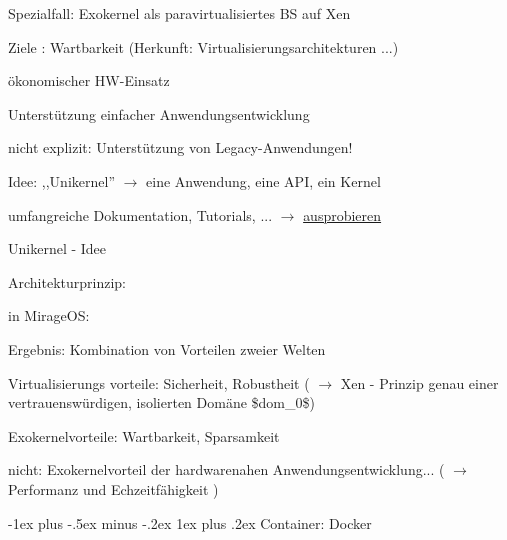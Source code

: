 \documentclass[a4paper]{article}
\makeatletter
\renewcommand{\subsubsection}{\@startsection{subsubsection}{3}{0mm}%
 {-1ex plus -.5ex minus -.2ex}%
 {1ex plus .2ex}%
 {\normalfont\small\bfseries}}
\makeatother
\begin{document}
\begin{multicols}{3}
    \begin{itemize*}
        \item
        Spezialfall: Exokernel als paravirtualisiertes BS auf Xen
        \item
        Ziele : Wartbarkeit (Herkunft: Virtualisierungsarchitekturen ...)
        \begin{itemize*}
            \item ökonomischer HW-Einsatz
            \item Unterstützung einfacher Anwendungsentwicklung
            \item nicht explizit: Unterstützung von Legacy-Anwendungen!
        \end{itemize*}
        \item
        Idee: ,,Unikernel'' $\rightarrow$ eine Anwendung, eine
        API, ein Kernel
        \item
        umfangreiche Dokumentation, Tutorials, ...
        $\rightarrow$
        \href{https://mirage.io/wiki/learning}{ausprobieren}
        \item
        Unikernel - Idee
        \begin{itemize*}
            \item Architekturprinzip: %
            \item in MirageOS: %
        \end{itemize*}
        \item
        Ergebnis: Kombination von Vorteilen zweier Welten
        \begin{itemize*}
            \item Virtualisierungs vorteile: Sicherheit, Robustheit ( $\rightarrow$ Xen - Prinzip genau einer vertrauenswürdigen, isolierten Domäne \$dom\_0\$)
            \item Exokernelvorteile: Wartbarkeit, Sparsamkeit
            \item nicht: Exokernelvorteil der hardwarenahen Anwendungsentwicklung... ( $\rightarrow$ Performanz und Echzeitfähigkeit )
        \end{itemize*}
    \end{itemize*}


    \subsubsection{Container: Docker}


\end{multicols}
\end{document}

